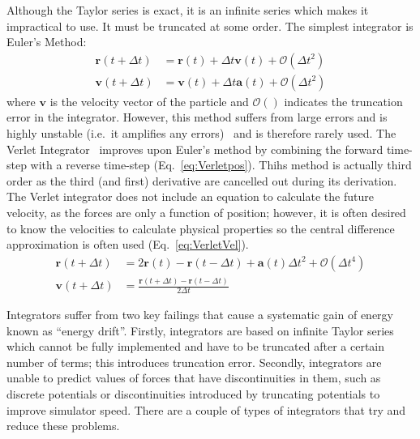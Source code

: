\documentclass[12pt]{UoAthesis} \usepackage{booktabs}
\begin{document}
Although the Taylor series is exact, it is an infinite series which
makes it impractical to use. It must be truncated at some order. The
simplest integrator is Euler's Method:
\begin{subequations} 
  \label{eq:Euler}
  \begin{align}
    \mathbf{r}(t+\Delta t) &= \mathbf{r}(t) + \Delta t \mathbf{v}(t)
    +\mathcal{O}(\Delta t^2) \\
    \mathbf{v}(t+\Delta t) &= \mathbf{v}(t) + \Delta t \mathbf{a}(t)
    +\mathcal{O}(\Delta t^2)
  \end{align}
\end{subequations}
where $\mathbf{v}$ is the velocity vector of the particle and
$\mathcal{O}()$ indicates the truncation error in the integrator.
However, this method suffers from large errors and is highly unstable
(i.e.\ it amplifies any errors)~\cite{Haile1997} and is therefore
rarely used. The Verlet Integrator~\cite{Verlet1967} improves upon
Euler's method by combining the forward time-step with a reverse
time-step (Eq.~\eqref{eq:Verletpos}). Thihs method is actually third
order as the third (and first) derivative are cancelled out during its
derivation. The Verlet integrator does not include an equation to
calculate the future velocity, as the forces are only a function of
position; however, it is often desired to know the velocities to calculate
physical properties so the central difference approximation is often
used (Eq.~\eqref{eq:VerletVel}).
\begin{subequations} 
  \begin{align} 
    \mathbf{r}(t + \Delta t) &= 2\mathbf{r}(t) - \mathbf{r}(t - \Delta t) 
    + \mathbf{a}(t)\Delta t^2 + \mathcal{O}(\Delta t^4)
    \label{eq:Verletpos} \\ 
    \mathbf{v}(t+\Delta t) &= \frac{\mathbf{r}(t+\Delta t) -
      \mathbf{r}(t-\Delta t)}{2\Delta t}
    \label{eq:VerletVel} 
  \end{align}
\end{subequations}

Integrators suffer from two key failings that cause a systematic gain
of energy known as ``energy drift''. Firstly, integrators are based on
infinite Taylor series which cannot be fully implemented and have to
be truncated after a certain number of terms; this introduces
truncation error. Secondly, integrators are unable to predict values
of forces that have discontinuities in them, such as discrete
potentials or discontinuities introduced by truncating potentials to
improve simulator speed.  There are a couple of types of integrators
that try and reduce these problems.
\end{document}
